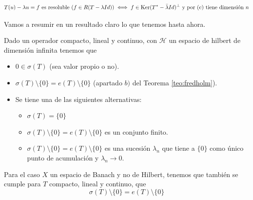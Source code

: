 \begin{equation*}
    T(u) - \lambda u = f \text{ es resoluble } (f \in R(T - \lambda Id)) \iff f \in \text{Ker}(T^* - \bar{\lambda} Id)^\perp \text{ y por (c) tiene dimensión } n \\
\end{equation*}

\noindent
Vamos a resumir en un resultado claro lo que tenemos hasta ahora.
\begin{coro}
    Dado un operador
    compacto, lineal y continuo, con $\mathcal{H}$ un espacio de hilbert de dimensión infinita tenemos que 
    \begin{itemize}
        \item $0 \in \sigma(T)$ (sea valor propio o no).
        \item $\sigma(T) \setminus \{0\} = e(T) \setminus \{0\}$ (apartado $b)$ del Teorema \ref{teo:fredholm}).
        \item Se tiene una de las siguientes alternativas:
        \begin{itemize}
            \item $\sigma(T) = \{0\}$
            \item $\sigma(T) \setminus \{0\} = e(T) \setminus \{0\}$ es un conjunto finito.
            \item $\sigma(T) \setminus \{0\} = e(T) \setminus \{0\}$ es una sucesión $\lambda_n$ que tiene a $\{0\}$ como único punto de acumulación y $\lambda_n \to 0$.
        \end{itemize}
    \end{itemize}
\end{coro}

\begin{observacion}
    Para el caso $X$ un espacio de Banach y no de Hilbert, tenemos que también se cumple para $T$ compacto, lineal y continuo, que
    \begin{equation*}
        \sigma(T) \setminus \{0\} = e(T) \setminus \{0\}
    \end{equation*}
\end{observacion}


